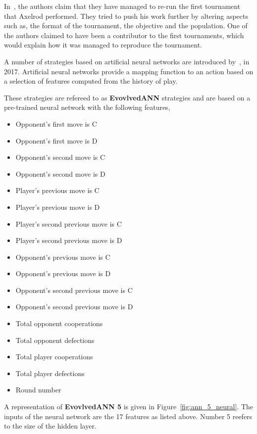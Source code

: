 \documentclass{article}
\theoremstyle{definition}
\begin{document}
In~\cite{Rapoport2015}, the authors claim that they have managed to
re-run the first tournament that Axelrod performed. They tried to push his work
further by altering aspects such as, the format of the tournament, the objective
and the population. One of the authors claimed to have been a contributor
to the first tournaments, which would explain how it was managed to reproduce
the tournament.

A number of strategies based on artificial neural networks are
introduced by~\cite{Knight2017}, in 2017. Artificial neural networks provide a mapping
function to an action based on a selection of features computed from the history
of play.

These strategies are refereed to as \textbf{EvovlvedANN} strategies and are
based on a pre-trained neural network with the following features,

\begin{multicols}{2}
    \begin{itemize}
        \item Opponent's first move is C
        \item Opponent's first move is D
        \item Opponent's second move is C
        \item Opponent's second move is D
        \item Player's previous move is C
        \item Player's previous move is D
        \item Player's second previous move is C
        \item Player's second previous move is D
        \item Opponent's previous move is C
        \item Opponent's previous move is D
        \item Opponent's second previous move is C
        \item Opponent's second previous move is D
        \item Total opponent cooperations
        \item Total opponent defections
        \item Total player cooperations
        \item Total player defections
        \item Round number
    \end{itemize}
\end{multicols}

A representation of \textbf{EvovlvedANN 5} is given in Figure~\ref{fig:ann_5_neural}.
The inputs of the neural network are the 17 features as listed above. Number 5
reefers to the size of the hidden layer.
\end{document}
